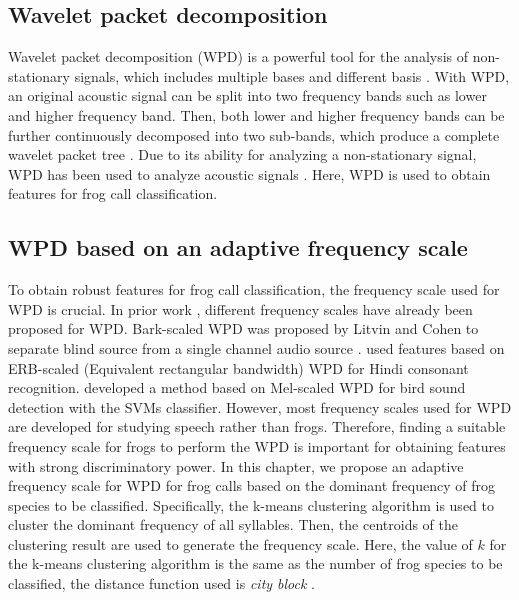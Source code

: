\subsection{Wavelet packet decomposition}
Wavelet packet decomposition (WPD) is a powerful tool for the analysis of non-stationary signals, which includes multiple bases and different basis \citep{selin2007wavelets}. With WPD, an original acoustic signal can be split into two frequency bands such as lower and higher frequency band. Then, both lower and higher frequency bands can be further continuously decomposed into two sub-bands, which produce a complete wavelet packet tree \citep{farooq2001mel}. Due to its ability for analyzing a non-stationary signal, WPD has been used to analyze acoustic signals \citep{selin2007wavelets, ren2008perceptually}. Here, WPD is used to obtain features for frog call classification. 

\subsection{WPD based on an adaptive frequency scale}
To obtain robust features for frog call classification, the frequency scale used for WPD is crucial. In prior work \citep{barkWPDraey, Biswas20141111, Zhang2015108}, different frequency scales have already been proposed for WPD. Bark-scaled WPD was proposed by Litvin and Cohen to separate blind source from a single channel audio source \citep{barkWPDraey}. \cite{Biswas20141111} used features based on ERB-scaled (Equivalent rectangular bandwidth) WPD for Hindi consonant recognition.  \cite{Zhang2015108} developed a method based on Mel-scaled WPD for bird sound detection with the SVMs classifier. However, most frequency scales used for WPD are developed for studying speech rather than frogs. Therefore, finding a suitable frequency scale for frogs to perform the WPD is important for obtaining features with strong discriminatory power. In this chapter, we propose an adaptive frequency scale for WPD for frog calls based on the dominant frequency of frog species to be classified. Specifically, the k-means clustering algorithm is used to cluster the dominant frequency of all syllables. Then, the centroids of the clustering result are used to generate the frequency scale. Here, the value of $k$ for the k-means clustering algorithm is the same as the number of frog species to be classified, the distance function used is \textit{city block} \citep{Melter1987235}. 


%
%




